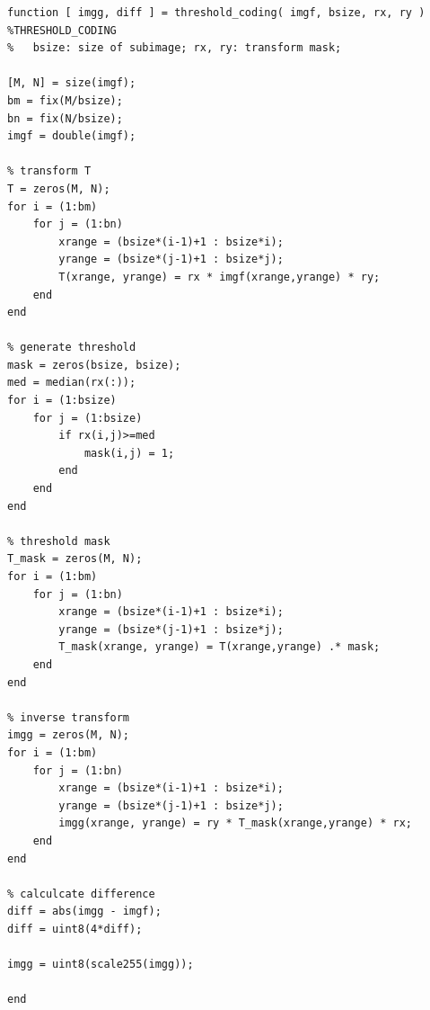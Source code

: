 \lstset{language=Matlab}
\begin{lstlisting}
function [ imgg, diff ] = threshold_coding( imgf, bsize, rx, ry )
%THRESHOLD_CODING 
%   bsize: size of subimage; rx, ry: transform mask;

[M, N] = size(imgf);
bm = fix(M/bsize);
bn = fix(N/bsize);
imgf = double(imgf);

% transform T
T = zeros(M, N);
for i = (1:bm)
    for j = (1:bn)
        xrange = (bsize*(i-1)+1 : bsize*i);
        yrange = (bsize*(j-1)+1 : bsize*j);
        T(xrange, yrange) = rx * imgf(xrange,yrange) * ry;
    end
end

% generate threshold 
mask = zeros(bsize, bsize);
med = median(rx(:));
for i = (1:bsize)
    for j = (1:bsize)
        if rx(i,j)>=med
            mask(i,j) = 1;
        end
    end
end

% threshold mask
T_mask = zeros(M, N);
for i = (1:bm)
    for j = (1:bn)
        xrange = (bsize*(i-1)+1 : bsize*i);
        yrange = (bsize*(j-1)+1 : bsize*j);
        T_mask(xrange, yrange) = T(xrange,yrange) .* mask;
    end
end

% inverse transform
imgg = zeros(M, N);
for i = (1:bm)
    for j = (1:bn)
        xrange = (bsize*(i-1)+1 : bsize*i);
        yrange = (bsize*(j-1)+1 : bsize*j);
        imgg(xrange, yrange) = ry * T_mask(xrange,yrange) * rx;
    end
end

% calculcate difference
diff = abs(imgg - imgf);
diff = uint8(4*diff);

imgg = uint8(scale255(imgg));

end
\end{lstlisting}



